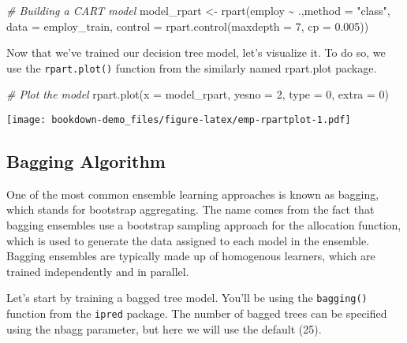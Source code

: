 \documentclass[
]{book}
\newenvironment{Shaded}{\begin{snugshade}}{\end{snugshade}}
\newcommand{\AttributeTok}[1]{\textcolor[rgb]{0.77,0.63,0.00}{#1}}
\newcommand{\CommentTok}[1]{\textcolor[rgb]{0.56,0.35,0.01}{\textit{#1}}}
\newcommand{\DecValTok}[1]{\textcolor[rgb]{0.00,0.00,0.81}{#1}}
\newcommand{\FloatTok}[1]{\textcolor[rgb]{0.00,0.00,0.81}{#1}}
\newcommand{\FunctionTok}[1]{\textcolor[rgb]{0.00,0.00,0.00}{#1}}
\newcommand{\NormalTok}[1]{#1}
\newcommand{\OtherTok}[1]{\textcolor[rgb]{0.56,0.35,0.01}{#1}}
\newcommand{\SpecialCharTok}[1]{\textcolor[rgb]{0.00,0.00,0.00}{#1}}
\newcommand{\StringTok}[1]{\textcolor[rgb]{0.31,0.60,0.02}{#1}}
\begin{document}
\begin{Shaded}
\begin{Highlighting}[]
\CommentTok{\# Building a CART model}
\NormalTok{model\_rpart }\OtherTok{\textless{}{-}} \FunctionTok{rpart}\NormalTok{(employ }\SpecialCharTok{\textasciitilde{}}\NormalTok{ .,}\AttributeTok{method =} \StringTok{"class"}\NormalTok{,}
                     \AttributeTok{data =}\NormalTok{ employ\_train, }
                     \AttributeTok{control =} \FunctionTok{rpart.control}\NormalTok{(}\AttributeTok{maxdepth =} \DecValTok{7}\NormalTok{,}
                                           \AttributeTok{cp =} \FloatTok{0.005}\NormalTok{))}
\end{Highlighting}
\end{Shaded}

Now that we've trained our decision tree model, let's visualize it. To do so, we use the \texttt{rpart.plot()} function from the similarly named rpart.plot package.

\begin{Shaded}
\begin{Highlighting}[]
\CommentTok{\# Plot the model}
\FunctionTok{rpart.plot}\NormalTok{(}\AttributeTok{x =}\NormalTok{ model\_rpart, }\AttributeTok{yesno =} \DecValTok{2}\NormalTok{, }\AttributeTok{type =} \DecValTok{0}\NormalTok{, }\AttributeTok{extra =} \DecValTok{0}\NormalTok{)}
\end{Highlighting}
\end{Shaded}

\texttt{[image: bookdown-demo\_files/figure-latex/emp-rpartplot-1.pdf]}

\hypertarget{bagging-algorithm}{%
\subsection{Bagging Algorithm}\label{bagging-algorithm}}

One of the most common ensemble learning approaches is known as bagging, which
stands for bootstrap aggregating. The name comes from the fact that bagging ensembles use a bootstrap sampling approach for the allocation function, which is used to generate the data assigned to each model in the ensemble. Bagging ensembles are typically made up of homogenous learners, which are trained independently and in parallel.

Let's start by training a bagged tree model. You'll be using the \texttt{bagging()} function from the \texttt{ipred} package. The number of bagged trees can be specified using the nbagg parameter, but here we will use the default (25).
\end{document}
